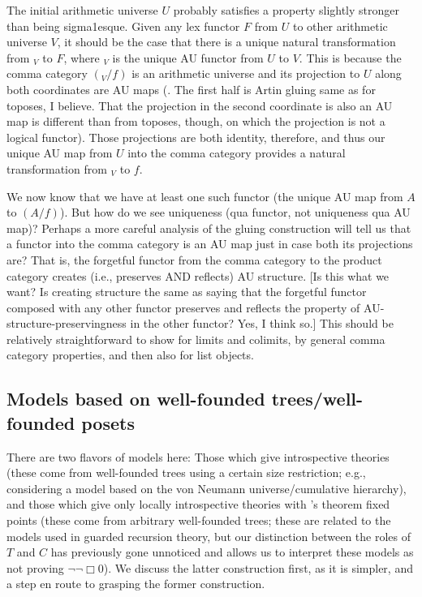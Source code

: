 \begin{TODOblock}
The initial arithmetic universe $U$ probably satisfies a property slightly stronger than being sigma1esque. Given any lex functor $F$ from $U$ to other arithmetic universe $V$, it should be the case that there is a unique natural transformation from $\!_V$ to $F$, where $\!_V$ is the unique AU functor from $U$ to $V$. This is because the comma category $(\!_V / f)$ is an arithmetic universe and its projection to $U$ along both coordinates are AU maps (\TODO. The first half is Artin gluing same as for toposes, I believe. That the projection in the second coordinate is also an AU map is different than from toposes, though, on which the projection is not a logical functor). Those projections are both identity, therefore, and thus our unique AU map from $U$ into the comma category provides a natural transformation from $\!_V$ to $f$.

We now know that we have at least one such functor (the unique AU map from $A$ to $(A/f)$). But how do we see uniqueness (qua functor, not uniqueness qua AU map)? Perhaps a more careful analysis of the gluing construction will tell us that a functor into the comma category is an AU map just in case both its projections are? That is, the forgetful functor from the comma category to the product category creates (i.e., preserves AND reflects) AU structure. [Is this what we want? Is creating structure the same as saying that the forgetful functor composed with any other functor preserves and reflects the property of AU-structure-preservingness in the other functor? Yes, I think so.] This should be relatively straightforward to show for limits and colimits, by general comma category properties, and then also for list objects. \TODO
\end{TODOblock}

\subsection{Models based on well-founded trees/well-founded posets}
There are two flavors of models here: Those which give introspective theories (these come from well-founded trees using a certain size restriction; e.g., considering a model based on the von Neumann universe/cumulative hierarchy), and those which give only locally introspective theories with \Loeb's theorem fixed points (these come from arbitrary well-founded trees; these are related to the models used in guarded recursion theory, but our distinction between the roles of $T$ and $C$ has previously gone unnoticed and allows us to interpret these models as not proving $\lnot \lnot \Box 0$). We discuss the latter construction first, as it is simpler, and a step en route to grasping the former construction.

